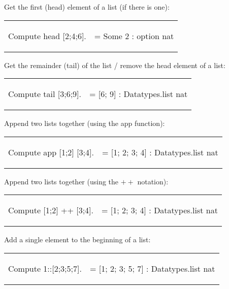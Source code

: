 \noindent
Get the first (head) element of a list (if there is one): 

\hspace{-1cm}
\begin{tabular}{p{8cm} p{8cm}}
\begin{code}	Compute head [2;4;6].			\end{code}
&
\begin{msg}	= Some 2     : option nat			\end{msg}
\end{tabular}

\noindent
Get the remainder (tail) of the list / remove the head element of a list: 

\hspace{-1cm}
\begin{tabular}{p{8cm} p{8cm}}
\begin{code}	Compute tail [3;6;9].				\end{code}
&
\begin{msg}	= [6; 9]     : Datatypes.list nat		\end{msg}
\end{tabular}

\noindent
Append two lists together (using the app function):

\hspace{-1cm}
\begin{tabular}{p{8cm} p{8cm}}
\begin{code}	Compute app [1;2] [3;4].			\end{code}
&
\begin{msg}	= [1; 2; 3; 4]     : Datatypes.list nat	\end{msg}
\end{tabular}

\noindent
Append two lists together (using the $++$ notation):

\hspace{-1cm}
\begin{tabular}{p{8cm} p{8cm}}
\begin{code}	Compute [1;2] ++ [3;4].			\end{code}
&
\begin{msg}	= [1; 2; 3; 4]     : Datatypes.list nat	\end{msg}
\end{tabular}

\newpage
\noindent
Add a single element to the beginning of a list:

\hspace{-1cm}
\begin{tabular}{p{8cm} p{8cm}}
\begin{code}	Compute 1::[2;3;5;7].				\end{code}
&
\begin{msg}	= [1; 2; 3; 5; 7]     : Datatypes.list nat	\end{msg}
\end{tabular}

